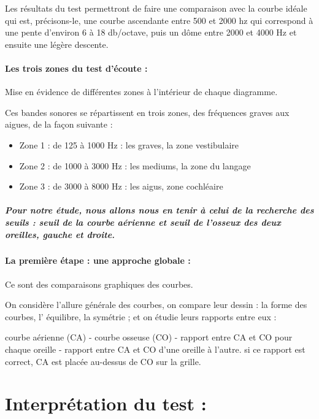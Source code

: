 Les résultats du test permettront de faire une comparaison avec la
courbe idéale qui est, précisons-le, une courbe ascendante entre 500 et 2000
hz qui correspond à une pente d\textquoteright environ 6 à 18 db/octave,
puis un dôme entre 2000 et 4000 Hz et ensuite une légère descente. 

\paragraph{Les trois zones du test d'écoute : }

Mise en évidence de différentes zones à l\textquoteright intérieur
de chaque diagramme. 

Ces bandes sonores se répartissent en trois zones, des fréquences
graves aux aigues, de la façon suivante :
\begin{itemize}
\item Zone 1 : de 125 à 1000 Hz : les graves, la zone vestibulaire
\item Zone 2 : de 1000 à 3000 Hz : les mediums, la zone du langage
\item Zone 3 : de 3000 à 8000 Hz : les aigus, zone cochléaire
\end{itemize}

\subparagraph*{Pour notre étude, nous allons nous en tenir à celui de la recherche
des seuils : seuil de la courbe aérienne et seuil de l'osseux des
deux oreilles, gauche et droite.}



\paragraph{La première étape : une approche globale : }

Ce sont des comparaisons graphiques des courbes. 

On considère l'allure générale des courbes, on compare leur dessin
: la forme des courbes, l' équilibre, la symétrie ; et on étudie leurs
rapports entre eux : 

courbe aérienne (CA) - courbe osseuse (CO) - rapport entre CA et CO
pour chaque oreille - rapport entre CA et CO d\textquoteright une
oreille à l'autre. si ce rapport est correct, CA est placée au-dessus
de CO sur la grille.
\section{Interprétation du test : }

